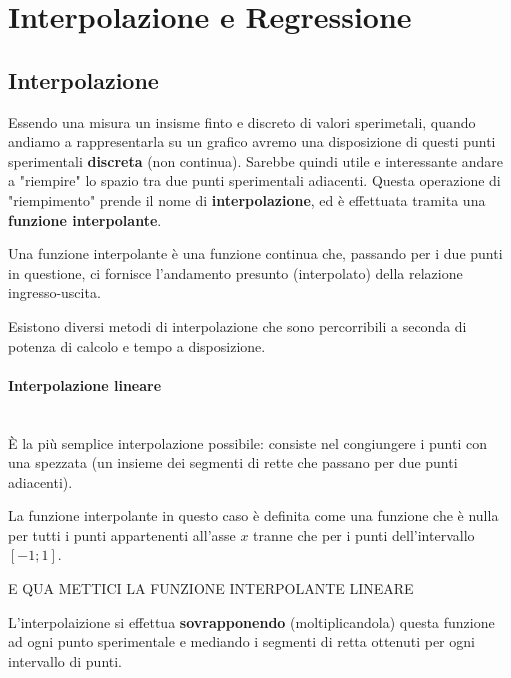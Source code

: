 \documentclass[a4paper,11pt]{report}
\begin{document}
\section{Interpolazione e Regressione}
\subsection{Interpolazione}
Essendo una misura un insisme finto e discreto di valori sperimetali, quando andiamo a rappresentarla su un grafico avremo una disposizione di questi punti sperimentali \textbf{discreta} (non continua). Sarebbe quindi utile e interessante andare a "riempire" lo spazio tra due punti sperimentali adiacenti. Questa operazione di "riempimento" prende il nome di \textbf{interpolazione}, ed è effettuata tramita una \textbf{funzione interpolante}.

Una funzione interpolante è una funzione continua che, passando per i due punti in questione, ci fornisce l'andamento presunto (interpolato) della relazione ingresso-uscita.

Esistono diversi metodi di interpolazione che sono percorribili a seconda di potenza di calcolo e tempo a disposizione.
\paragraph{Interpolazione lineare}~\\
È la più semplice interpolazione possibile: consiste nel congiungere i punti con una spezzata (un insieme dei segmenti di rette che passano per due punti adiacenti).

La funzione interpolante in questo caso è definita come una funzione che è nulla per tutti i punti appartenenti all'asse $x$ tranne che per i punti dell'intervallo $[-1;1]$.
\begin{center}
  E QUA METTICI LA FUNZIONE INTERPOLANTE LINEARE
\end{center}
L'interpolaizione si effettua \textbf{sovrapponendo} (moltiplicandola) questa funzione ad ogni punto sperimentale e mediando i segmenti di retta ottenuti per ogni intervallo di punti.
\end{document}
